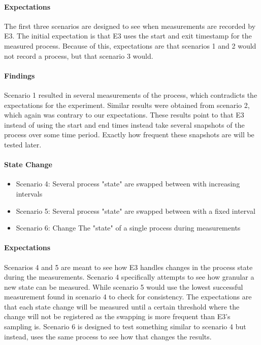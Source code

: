 \paragraph {Expectations}
The first three scenarios are designed to see when measurements are recorded by E3. The initial expectation is that E3 uses the start and exit timestamp for the measured process. Because of this, expectations are that scenarios 1 and 2 would not record a process, but that scenario 3 would.

\paragraph{Findings}
Scenario 1 resulted in several measurements of the process, which contradicts the expectations for the experiment. Similar results were obtained from scenario 2, which again was contrary to our expectations. These results point to that E3 instead of using the start and end times instead take several snapshots of the process over some time period. Exactly how frequent these snapshots are will be tested later. 

\paragraph{State Change}

\begin{itemize}
    \item Scenario 4: Several process "state" are swapped between with increasing intervals
    \item Scenario 5: Several process "state" are swapped between with a fixed interval
    \item Scenario 6: Change The "state" of a single process during measurements
\end{itemize}

\paragraph{Expectations}
Scenarios 4 and 5 are meant to see how E3 handles changes in the process state during the measurements. Scenario 4 specifically attempts to see how granular a new state can be measured. While scenario 5 would use the lowest successful measurement found in scenario 4 to check for consistency. The expectations are that each state change will be measured until a certain threshold where the change will not be registered as the swapping is more frequent than E3's sampling is. Scenario 6 is designed to test something similar to scenario 4 but instead, uses the same process to see how that changes the results.
